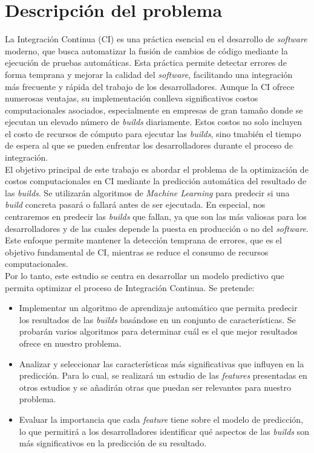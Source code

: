 \section{Descripción del problema}
La Integración Continua (CI) es una práctica esencial en el desarrollo de \textit{software}
moderno, que busca automatizar la fusión de cambios de código mediante la ejecución de pruebas
automáticas. Esta práctica permite detectar errores de forma temprana y mejorar la calidad del
\textit{software}, facilitando una integración más frecuente y rápida del trabajo de los
desarrolladores. Aunque la CI ofrece numerosas ventajas, su implementación conlleva
significativos costos computacionales asociados, especialmente en empresas de gran tamaño donde
se ejecutan un elevado número de \textit{builds} diariamente. Estos costos no solo incluyen el
costo de recursos de cómputo para ejecutar las \textit{builds}, sino tmabién el tiempo de espera
al que se pueden enfrentar los desarrolladores durante el proceso de integración. \\

El objetivo principal de este trabajo es abordar el problema de la optimización de costos
computacionales en CI mediante la predicción automática del resultado de las
\textit{builds}. Se utilizarán algoritmos de \textit{Machine Learning} para predecir si una
\textit{build} concreta pasará o fallará antes de ser ejecutada. En especial, nos centraremos
en predecir las \textit{builds} que fallan, ya que son las más valiosas para los desarrolladores
y de las cuales depende la puesta en producción o no del \textit{software}. Este enfoque
permite mantener la detección temprana de errores, que es el objetivo fundamental de CI,
mientras se reduce el consumo de recursos computacionales.\\

Por lo tanto, este estudio se centra en desarrollar un modelo predictivo que permita optimizar
el proceso de Integración Continua. Se pretende:

\begin{itemize}
    \item Implementar un algoritmo de aprendizaje automático que permita predecir los resultados
    de las \textit{builds} basándose en un conjunto de características. Se probarán varios
    algoritmos para determinar cuál es el que mejor resultados ofrece en nuestro problema.\\
    \item Analizar y seleccionar las características más significativas que influyen en la
    predicción. Para lo cual, se realizará un estudio de las \textit{features} presentadas en
    otros estudios y se añadirán otras que puedan ser relevantes para nuestro problema.\\
    \item Evaluar la importancia que cada \textit{feature} tiene sobre el modelo de predicción, lo
    que permitirá a los desarrolladores identificar qué aspectos de las \textit{builds} son
    más significativos en la predicción de su resultado.
\end{itemize}
